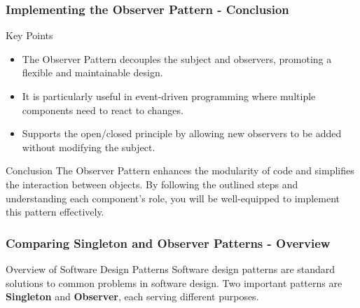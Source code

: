 \documentclass{beamer}
\begin{document}
\begin{frame}[fragile]
    \frametitle{Implementing the Observer Pattern - Conclusion}
    \begin{block}{Key Points}
        \begin{itemize}
            \item The Observer Pattern decouples the subject and observers, promoting a flexible and maintainable design.
            \item It is particularly useful in event-driven programming where multiple components need to react to changes.
            \item Supports the open/closed principle by allowing new observers to be added without modifying the subject.
        \end{itemize}
    \end{block}
    
    \begin{block}{Conclusion}
        The Observer Pattern enhances the modularity of code and simplifies the interaction between objects. 
        By following the outlined steps and understanding each component's role, you will be well-equipped to implement this pattern effectively.
    \end{block}
\end{frame}

\begin{frame}
    \frametitle{Comparing Singleton and Observer Patterns - Overview}
    \begin{block}{Overview of Software Design Patterns}
        Software design patterns are standard solutions to common problems in software design. 
        Two important patterns are \textbf{Singleton} and \textbf{Observer}, each serving different purposes.
    \end{block}
\end{frame}
\end{document}
